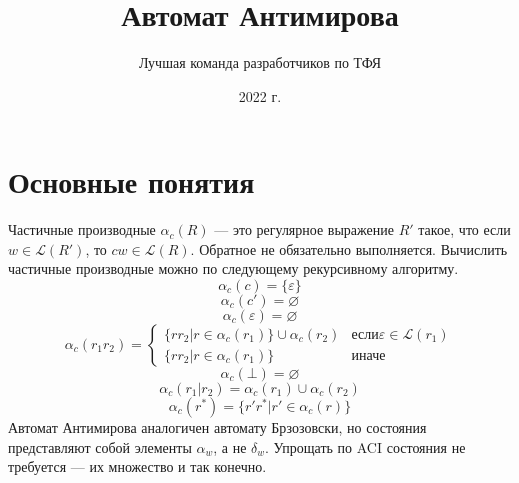 \documentclass[mathserif]{beamer}
\title[] {Автомат Антимирова}
\author[Chipollino]{Лучшая команда разработчиков по ТФЯ} %
\date[] 
{2022 г.}
\newcommand{\Lang}{\mathscr{L}} %
\def\star{\ensuremath{^{*}}}%
\newcommand{\empt}{\varepsilon} %
\begin{document}
\maketitle
\section{Основные понятия}
\begin{frame}{Частичные производные}
    \vspace{-5pt}
    $\alpha_{c}(R)$ — это регулярное выражение $R'$ такое, что если $w \in \Lang(R')$, то $cw \in \Lang(R)$. Обратное не обязательно выполняется. Вычислить частичные производные можно по следующему рекурсивному алгоритму.
    \[\alpha_{c}(c) = \{\empt\}\] %
    \[\alpha_{c}(c') = \varnothing\] %
    \[\alpha_{c}(\empt) = \varnothing\] %
    \begin{equation*}
        \alpha_{c}(r_{1} r_{2}) =
        \begin{cases}
            \{r r_{2} | r \in \alpha_{c}(r_{1})\} \cup \alpha_{c}(r_{2}) & \text {если} \empt \in \Lang(r_{1}) \\ %
            \{r r_{2} | r \in \alpha_{c}(r_{1})\}                        & \text {иначе}                       %
        \end{cases}
    \end{equation*}
    \[\alpha_{c}(\bot) = \varnothing\] %
    \[\alpha_{c}(r_{1}|r_{2}) = \alpha_{c}(r_{1}) \cup \alpha_{c}(r_{2})\] %
    \[\alpha_{c}(r\star) = \{r'r\star | r' \in \alpha_{c}(r)\}\] %
    Автомат Антимирова аналогичен автомату Брзозовски, но состояния представляют собой элементы $\alpha_{w}$, а не $\delta_{w}$. Упрощать по ACI состояния не требуется — их множество и так конечно.
\end{frame} %
\end{document}
